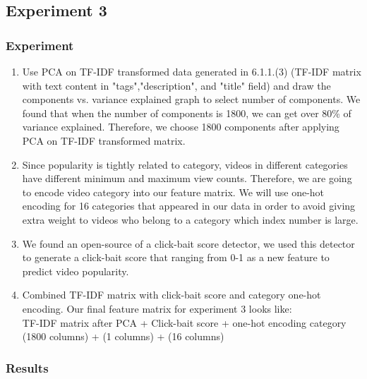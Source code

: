 \documentclass[english]{article}
\begin{document}
\subsection{Experiment 3}
\subsubsection{Experiment}
\begin{enumerate}
\item Use PCA on TF-IDF transformed data generated in 6.1.1.(3) (TF-IDF matrix with text content in "tags","description", and "title" field) and draw the components vs. variance explained graph to select number of components.
We found that when the number of components is 1800, we can get over 80\% of variance explained. Therefore, we choose 1800 components after applying PCA on TF-IDF transformed matrix.
\item Since popularity is tightly related to category, videos in different categories have different minimum and maximum view counts. Therefore, we are going to encode video category into our feature matrix. We will use one-hot encoding for 16 categories that appeared in our data in order to avoid giving extra weight to videos who belong to a category which index number is large.
\item We found an open-source of a click-bait score detector\cite{click-bait}, we used this detector to generate a click-bait score that ranging from 0-1 as a new feature to predict video popularity.
\item Combined TF-IDF matrix with click-bait score and category one-hot encoding. Our final feature matrix for experiment 3 looks like: \\
    TF-IDF matrix after PCA  + Click-bait score  + one-hot encoding category\\
    (1800 columns) + (1 columns)  +  (16 columns)
\end{enumerate}
\subsubsection{Results}
\end{document}
